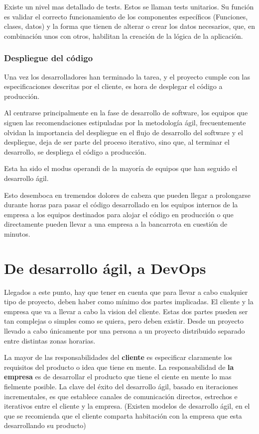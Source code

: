 \documentclass[12pt]{report} %
\begin{document}
Existe un nivel mas detallado de tests.  Estos se llaman tests unitarios.  Su
función es validar el correcto funcionamiento de los componentes específicos
(Funciones, clases, datos) y la forma  que tienen de alterar o crear los datos
necesarios, que, en combinación unos con otros, habilitan la creación de la
lógica de la aplicación.

\subsubsection{Despliegue del código}

Una vez los desarrolladores han terminado la tarea, y el proyecto cumple con las
especificaciones descritas por el cliente, es hora de desplegar el código a
producción.

Al centrarse principalmente en la fase de desarrollo de software, los equipos
que siguen las recomendaciones estipuladas por la metodología ágil,
frecuentemente olvidan la importancia del despliegue en el flujo de desarrollo
del software y el despliegue, deja de ser parte del proceso iterativo, sino que,
al terminar el desarrollo, se despliega el código a producción.

Esta ha sido el modus operandi de la mayoría de equipos que han seguido el
desarrollo ágil.

Esto desemboca en tremendos dolores de cabeza que pueden llegar a prolongarse
durante horas para pasar el código desarrollado en los equipos internos de la
empresa a los equipos destinados para alojar el código en producción o que
directamente pueden llevar a una empresa a la bancarrota en cuestión de minutos.
\cite{seven2014}

\section{De desarrollo ágil, a DevOps}

Llegados a este punto, hay que tener en cuenta que para llevar a cabo cualquier
tipo de proyecto, deben haber como mínimo dos partes implicadas.  El cliente y
la empresa que va a llevar a cabo la vision del cliente.  Estas dos partes
pueden ser tan complejas o simples como se quiera, pero deben existir.  Desde un
proyecto llevado a cabo únicamente por una persona a un proyecto distribuido
separado entre distintas zonas horarias.

La mayor de las responsabilidades del \textbf{cliente} es especificar claramente
los requisitos del producto o idea que tiene en mente.  La responsabilidad de
\textbf{la empresa} es de desarrollar el producto que tiene el ciente en mente
lo mas fielmente posible.  La clave del éxito del desarrollo ágil, basado en
iteraciones incrementales, es que establece canales de comunicación directos,
estrechos e iterativos entre el cliente y la empresa.  (Existen modelos de
desarrollo ágil, en el que se recomienda que el cliente comparta habitación con
la empresa que esta desarrollando su producto)
\end{document}
